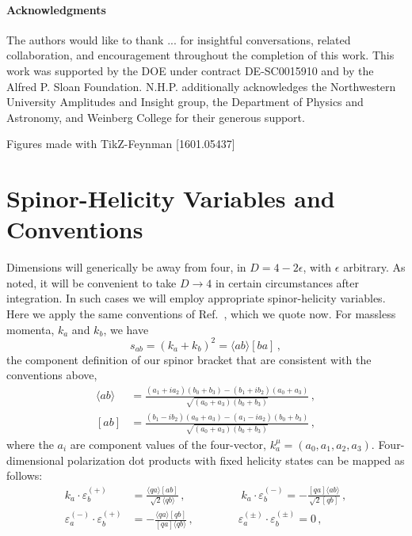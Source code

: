 \documentclass[11pt,letter]{article}
\begin{document}
\paragraph{Acknowledgments} The authors would like to thank ... for insightful conversations, related collaboration, and encouragement throughout the completion of this work. This work was supported by the DOE under contract DE-SC0015910 and by the Alfred P. Sloan Foundation. N.H.P. additionally acknowledges the Northwestern University Amplitudes and Insight group, the Department of Physics and Astronomy, and Weinberg College for their generous support. 

Figures made with TikZ-Feynman [1601.05437]

\appendix
\section{Spinor-Helicity Variables and Conventions}
Dimensions will generically be away from four, in $D=4-2\epsilon$, with $\epsilon$ arbitrary. As noted, it will be convenient to take $D\rightarrow 4$ in certain circumstances after integration.  In such cases we will employ appropriate spinor-helicity variables.  Here we apply the same conventions of Ref.~\cite{jjmcTASI2014}, which we quote now. For massless momenta, $k_a$ and $k_b$, we have 
\begin{equation}
s_{ab} = (k_a+k_b)^2= \langle ab \rangle[ba]\,,
\end{equation}
the component definition of our spinor bracket that are consistent with the conventions above,
\begin{align}
\langle ab \rangle &= \frac{(a_1 + i a_2)(b_0+b_3)-(b_1 + i b_2)(a_0+a_3)}{\sqrt{(a_0+a_3)(b_0+b_3)}}\,,
\\
[ab] &= \frac{(b_1 - i b_2)(a_0+a_3)-(a_1 - i a_2)(b_0+b_3)}{\sqrt{(a_0+a_3)(b_0+b_3)}}\,,
\end{align}
where the $a_i$ are component values of the four-vector, $k^\mu_a = (a_0,a_1,a_2,a_3)$. Four-dimensional polarization dot products with fixed helicity states can be mapped as follows:
\begin{equation}\label{eqn:4DPols}
\begin{aligned}
k_a \cdot \varepsilon_b^{(+)} &= \frac{\langle q a \rangle[ab]}{\sqrt{2}\langle q b\rangle}\,,
\qquad\quad \qquad
k_a \cdot \varepsilon_b^{(-)} = -\frac{[qa]\langle ab\rangle}{\sqrt{2}[qb]}\,,
\\
\varepsilon_a^{(-)}\cdot \varepsilon_b^{(+)} &= - \frac{\langle q a\rangle [qb]}{ [qa]\langle q b\rangle} \,,
\qquad \qquad
\varepsilon_a^{(\pm)}\cdot \varepsilon_b^{(\pm)} = 0 \,,
\end{aligned}
\end{equation}
\end{document}
